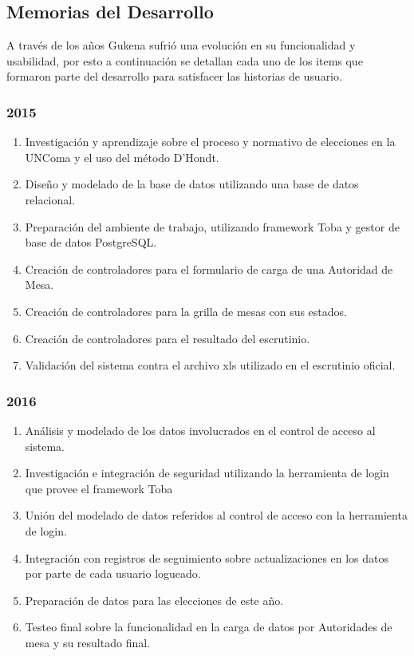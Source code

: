 \subsection{Memorias del Desarrollo}
A través de los años Gukena sufrió una evolución en su funcionalidad y usabilidad, por esto a continuación se detallan cada uno de los items que formaron parte del desarrollo para satisfacer las historias de usuario.

\subsubsection{2015}

\begin{enumerate}
    
    \item Investigación y aprendizaje sobre el proceso y normativo de elecciones en la UNComa y el uso del método D'Hondt.
    \item Diseño y modelado de la base de datos utilizando una base de datos relacional.
    \item Preparación del ambiente de trabajo, utilizando framework Toba y gestor de base de datos PostgreSQL.
    \item Creación de controladores para el formulario de carga de una Autoridad de Mesa.
    \item Creación de controladores para la grilla de mesas con sus estados.
    \item Creación de controladores para el resultado del escrutinio.
    \item Validación del sistema contra el archivo xls utilizado en el escrutinio oficial.
\end{enumerate}
\subsubsection{2016}
\begin{enumerate}
    \item Análisis y modelado de los datos involucrados en el control de acceso al sistema.
    \item Investigación e integración de seguridad utilizando la herramienta de login que provee el framework Toba
    \item Unión del modelado de datos referidos al control de acceso con la herramienta de login.
    \item Integración con registros de seguimiento sobre actualizaciones en los datos por parte de cada usuario logueado.
    \item Preparación de datos para las elecciones de este año.
    \item Testeo final sobre la funcionalidad en la carga de datos por Autoridades de mesa y su resultado final.
\end{enumerate}
